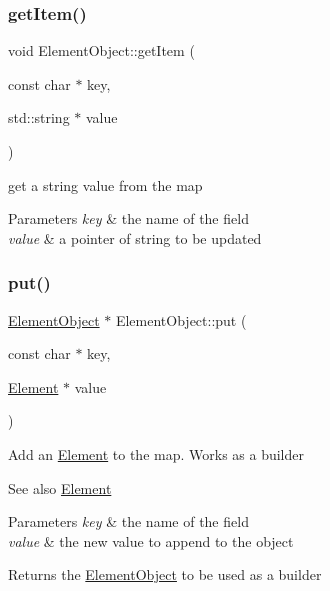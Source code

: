\subsubsection{\texorpdfstring{get\+Item()}{getItem()}\hspace{0.1cm}{\footnotesize\ttfamily [7/7]}}
{\footnotesize\ttfamily void Element\+Object\+::get\+Item (\begin{DoxyParamCaption}\item[{const char $\ast$}]{key,  }\item[{std\+::string $\ast$}]{value }\end{DoxyParamCaption})}

get a string value from the map


\begin{DoxyParams}{Parameters}
{\em key} & the name of the field \\
\hline
{\em value} & a pointer of string to be updated \\
\hline
\end{DoxyParams}
\mbox{\label{classElementObject_ab9dd82037b752ab2e6f4e3de53348483}} 
\subsubsection{\texorpdfstring{put()}{put()}}
{\footnotesize\ttfamily \mbox{\hyperlink{classElementObject}{Element\+Object}} $\ast$ Element\+Object\+::put (\begin{DoxyParamCaption}\item[{const char $\ast$}]{key,  }\item[{\mbox{\hyperlink{classElement}{Element}} $\ast$}]{value }\end{DoxyParamCaption})}

Add an \mbox{\hyperlink{classElement}{Element}} to the map. Works as a builder \begin{DoxySeeAlso}{See also}
\mbox{\hyperlink{classElement}{Element}}
\end{DoxySeeAlso}

\begin{DoxyParams}{Parameters}
{\em key} & the name of the field \\
\hline
{\em value} & the new value to append to the object \\
\hline
\end{DoxyParams}
\begin{DoxyReturn}{Returns}
the \mbox{\hyperlink{classElementObject}{Element\+Object}} to be used as a builder 
\end{DoxyReturn}
\mbox{\label{classElementObject_a2217d9754771964af5e590a5fabe2c4e}} 
